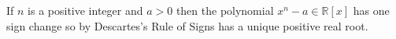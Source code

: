 \documentclass[12pt]{article}
\begin{document}
If $n$ is a positive integer and $a>0$ then the polynomial 
$x^n-a \in \mathbb{R}[x]$ has one sign change so by Descartes's Rule of Signs has 
a unique positive real root. 

\end{document}
